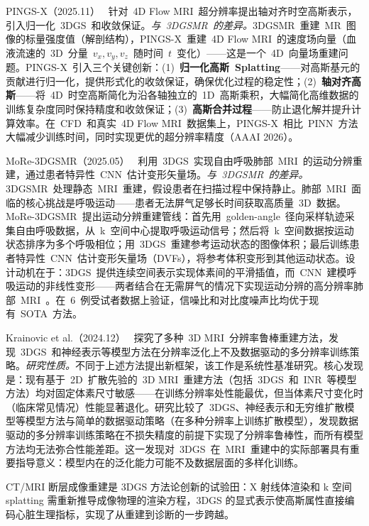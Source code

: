 PINGS-X（2025.11）~\cite{2511_11048} 针对~4D Flow MRI~超分辨率提出轴对齐时空高斯表示，引入归一化~3DGS~和收敛保证。\textit{与~3DGSMR~的差异。}3DGSMR~重建~MR~图像的标量强度值（解剖结构），PINGS-X~重建~4D Flow MRI~的速度场向量（血液流速的~3D~分量~$v_x, v_y, v_z$~随时间~$t$~变化）——这是一个~4D~向量场重建问题。PINGS-X~引入三个关键创新：(1)~\textbf{归一化高斯~Splatting}——对高斯基元的贡献进行归一化，提供形式化的收敛保证，确保优化过程的稳定性；(2)~\textbf{轴对齐高斯}——将~4D~时空高斯简化为沿各轴独立的~1D~高斯乘积，大幅简化高维数据的训练复杂度同时保持精度和收敛保证；(3)~\textbf{高斯合并过程}——防止退化解并提升计算效率。在~CFD~和真实~4D Flow MRI~数据集上，PINGS-X~相比~PINN~方法大幅减少训练时间，同时实现更优的超分辨率精度（AAAI 2026）。

MoRe-3DGSMR（2025.05）~\cite{2505_04959} 利用~3DGS~实现自由呼吸肺部~MRI~的运动分辨重建，通过患者特异性~CNN~估计变形矢量场。\textit{与~3DGSMR~的差异。}3DGSMR~处理静态~MRI~重建，假设患者在扫描过程中保持静止。肺部~MRI~面临的核心挑战是呼吸运动——患者无法屏气足够长时间获取高质量~3D~数据。MoRe-3DGSMR~提出运动分辨重建管线：首先用~golden-angle~径向采样轨迹采集自由呼吸数据，从~k~空间中心提取呼吸运动信号；然后将~k~空间数据按运动状态排序为多个呼吸相位；用~3DGS~重建参考运动状态的图像体积；最后训练患者特异性~CNN~估计变形矢量场（DVFs），将参考体积变形到其他运动状态。设计动机在于：3DGS~提供连续空间表示实现体素间的平滑插值，而~CNN~建模呼吸运动的非线性变形——两者结合在无需屏气的情况下实现运动分辨的高分辨率肺部~MRI~。在~6~例受试者数据上验证，信噪比和对比度噪声比均优于现有~SOTA~方法。

Krainovic et al.（2024.12）~\cite{2412_18584} 探究了多种~3D MRI~分辨率鲁棒重建方法，发现~3DGS~和神经表示等模型方法在分辨率泛化上不及数据驱动的多分辨率训练策略。\textit{研究性质。}不同于上述方法提出新框架，该工作是系统性基准研究。核心发现是：现有基于~2D~扩散先验的~3D MRI~重建方法（包括~3DGS~和~INR~等模型方法）均对固定体素尺寸敏感——在训练分辨率处性能最优，但当体素尺寸变化时（临床常见情况）性能显著退化。研究比较了~3DGS、神经表示和无穷维扩散模型等模型方法与简单的数据驱动策略（在多种分辨率上训练扩散模型），发现数据驱动的多分辨率训练策略在不损失精度的前提下实现了分辨率鲁棒性，而所有模型方法均无法弥合性能差距。这一发现对~3DGS~在~MRI~重建中的实际部署具有重要指导意义：模型内在的泛化能力可能不及数据层面的多样化训练。

\begin{takeaway}
CT/MRI 断层成像重建是 3DGS 方法论创新的试验田：X 射线体渲染和 k 空间 splatting 需重新推导成像物理的渲染方程，3DGS 的显式表示使高斯属性直接编码心脏生理指标，实现了从重建到诊断的一步跨越。
\end{takeaway}

